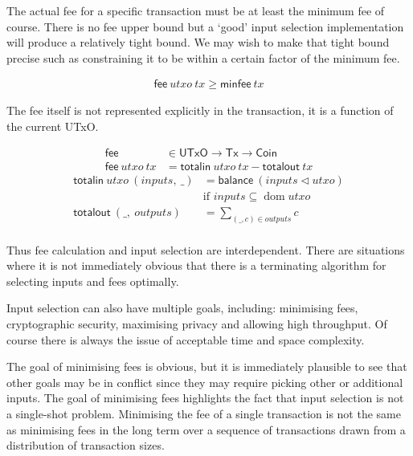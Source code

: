 \documentclass{article}
\newcommand{\restrictdom}{\lhd}
\DeclareMathOperator{\dom}{dom}
\theoremstyle{definition}{
  \newtheorem{lemma}{Lemma}[section] %
  \newtheorem{definition}[lemma]{Definition}
}
\theoremstyle{theorem}{
  \newtheorem{invariant}[lemma]{Invariant}
  \newtheorem{proofobligation}[lemma]{Proof Obligation}
}
\numberwithin{equation}{lemma}
\begin{document}
The actual fee for a specific transaction must be at least the minimum fee of
course. There is no fee upper bound but a `good' input selection
implementation will produce a relatively tight bound. We may wish to make that
tight bound precise such as constraining it to be within a certain factor of
the minimum fee.

\begin{equation}
\begin{split}
\mathsf{fee} ~ utxo ~ tx \geq \mathsf{minfee} ~ tx
\end{split}
\end{equation}

The fee itself is not represented explicitly in the transaction, it is a
function of the current UTxO.

\begin{equation}
\begin{split}
\mathsf{fee} & \in \mathsf{UTxO} \to \mathsf{Tx} \to \mathsf{Coin} \\
\mathsf{fee} ~ utxo ~ tx & = \mathsf{totalin} ~ utxo ~ tx - \mathsf{totalout} ~ tx
\end{split}
\end{equation}
%
\begin{equation}
\begin{split}
\mathsf{totalin} ~ utxo ~ (inputs, ~ \_) & = \mathsf{balance} ~ (inputs \restrictdom utxo) \\
                 & \text{if } inputs \subseteq \dom utxo \\
\mathsf{totalout} ~ (\_, ~ outputs) & = \sum_{(\_, c) \in outputs} c \\
\end{split}
\end{equation}

Thus fee calculation and input selection are interdependent. There are
situations where it is not immediately obvious that there is a terminating
algorithm for selecting inputs and fees optimally.

Input selection can also have multiple goals, including: minimising fees,
cryptographic security, maximising privacy and allowing high throughput. Of
course there is always the issue of acceptable time and space complexity.

The goal of minimising fees is obvious, but it is immediately plausible to see
that other goals may be in conflict since they may require picking other or
additional inputs. The goal of minimising fees highlights the fact that input
selection is not a single-shot problem. Minimising the fee of a single
transaction is not the same as minimising fees in the long term over a
sequence of transactions drawn from a distribution of transaction sizes.
\end{document}
